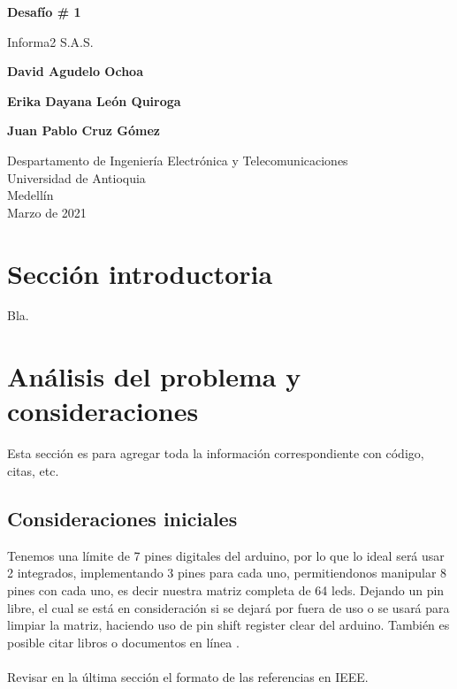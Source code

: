 \documentclass{article}
\begin{document}
\begin{titlepage}
    \begin{center}
        \vspace*{1cm}
            
        \Huge
        \textbf{Desafío \# 1}
            
        \vspace{0.5cm}
        \LARGE
        Informa2 S.A.S.
            
        \vspace{1.5cm}
            
        \textbf{David Agudelo Ochoa}
        
        \vspace{0.5cm}
        
        \textbf{Erika Dayana León Quiroga}
        
        \vspace{0.5cm}
        
        \textbf{Juan Pablo Cruz Gómez}
            
        \vfill
            
        \vspace{0.8cm}
            
        \Large
        Despartamento de Ingeniería Electrónica y Telecomunicaciones\\
        Universidad de Antioquia\\
        Medellín\\
        Marzo de 2021
            
    \end{center}
\end{titlepage}

\tableofcontents
\newpage
\section{Sección introductoria}\label{intro}
Bla.

\section{Análisis del problema y consideraciones} \label{contenido}
Esta sección es para agregar toda la información correspondiente con código, citas, etc.
\subsection{Consideraciones iniciales}
Tenemos una límite de 7 pines digitales del arduino, por lo que lo ideal será usar 2 integrados, implementando 3 pines para cada uno, permitiendonos manipular 8 pines con cada uno, es decir nuestra matriz completa de 64 leds. Dejando un pin libre, el cual se está en consideración si se dejará por fuera de uso o se usará para limpiar la matriz, haciendo uso de pin shift register clear del arduino. 
También es posible citar libros \cite{dirac} o documentos en línea \cite{knuthwebsite}.\\\\
Revisar en la última sección el formato de las referencias en IEEE.
\end{document}
